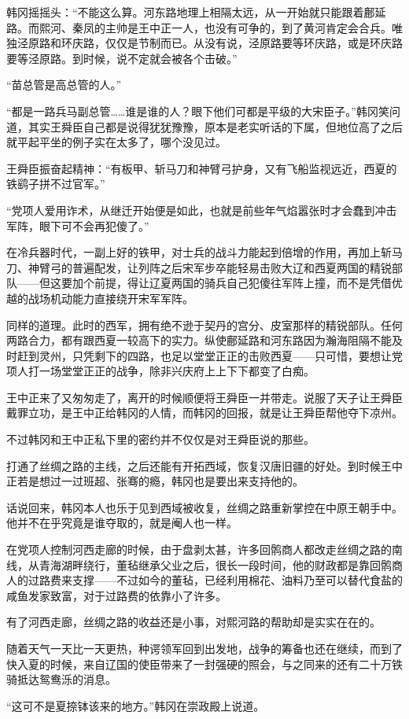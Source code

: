 韩冈摇摇头：“不能这么算。河东路地理上相隔太远，从一开始就只能跟着鄜延路。而熙河、秦凤的主帅是王中正一人，也没有可争的，到了黄河肯定会合兵。唯独泾原路和环庆路，仅仅是节制而已。从没有说，泾原路要等环庆路，或是环庆路要等泾原路。到时候，说不定就会被各个击破。”

“苗总管是高总管的人。”

“都是一路兵马副总管……谁是谁的人？眼下他们可都是平级的大宋臣子。”韩冈笑问道，其实王舜臣自己都是说得犹犹豫豫，原本是老实听话的下属，但地位高了之后就平起平坐的例子实在太多了，哪个没见过。

王舜臣振奋起精神：“有板甲、斩马刀和神臂弓护身，又有飞船监视远近，西夏的铁鹞子拼不过官军。”

“党项人爱用诈术，从继迁开始便是如此，也就是前些年气焰嚣张时才会蠢到冲击军阵，眼下可不会再犯傻了。”

在冷兵器时代，一副上好的铁甲，对士兵的战斗力能起到倍增的作用，再加上斩马刀、神臂弓的普遍配发，让列阵之后宋军步卒能轻易击败大辽和西夏两国的精锐部队——但这要加个前提，得让辽夏两国的骑兵自己犯傻往军阵上撞，而不是凭借优越的战场机动能力直接绕开宋军军阵。

同样的道理。此时的西军，拥有绝不逊于契丹的宫分、皮室那样的精锐部队。任何两路合力，都有跟西夏一较高下的实力。纵使鄜延路和河东路因为瀚海阻隔不能及时赶到灵州，只凭剩下的四路，也足以堂堂正正的击败西夏——只可惜，要想让党项人打一场堂堂正正的战争，除非兴庆府上上下下都变了白痴。

王中正来了又匆匆走了，离开的时候顺便将王舜臣一并带走。说服了天子让王舜臣戴罪立功，是王中正给韩冈的人情，而韩冈的回报，就是让王舜臣帮他夺下凉州。

不过韩冈和王中正私下里的密约并不仅仅是对王舜臣说的那些。

打通了丝绸之路的主线，之后还能有开拓西域，恢复汉唐旧疆的好处。到时候王中正若是想过一过班超、张骞的瘾，韩冈也是要出来支持他的。

话说回来，韩冈本人也乐于见到西域被收复，丝绸之路重新掌控在中原王朝手中。他并不在乎究竟是谁夺取的，就是阉人也一样。

在党项人控制河西走廊的时候，由于盘剥太甚，许多回鹘商人都改走丝绸之路的南线，从青海湖畔绕行，董毡继承父业之后，很长一段时间，他的财政都是靠回鹘商人的过路费来支撑——不过如今的董毡，已经利用棉花、油料乃至可以替代食盐的咸鱼发家致富，对于过路费的依靠小了许多。

有了河西走廊，丝绸之路的收益还是小事，对熙河路的帮助却是实实在在的。

随着天气一天比一天更热，种谔领军回到出发地，战争的筹备也还在继续，而到了快入夏的时候，来自辽国的使臣带来了一封强硬的照会，与之同来的还有二十万铁骑抵达鸳鸯泺的消息。

“这可不是夏捺钵该来的地方。”韩冈在崇政殿上说道。

